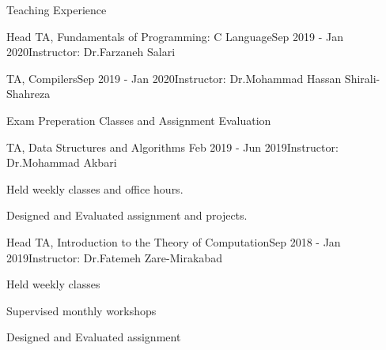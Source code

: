 \documentclass{resume} %
\begin{document}
\begin{rSection}{Teaching Experience}
\begin{rSubsection}{Head TA, Fundamentals of Programming: C Language}{Sep 2019 - Jan 2020}{Instructor: Dr.Farzaneh Salari}{ }
		\end{rSubsection}					%
		\begin{rSubsection}{TA, Compilers}{Sep 2019 - Jan 2020}{Instructor: Dr.Mohammad Hassan Shirali-Shahreza}{ }
		\item Exam Preperation Classes and Assignment Evaluation
		\end{rSubsection}					%
		\begin{rSubsection}{TA, Data Structures and Algorithms }{Feb 2019 - Jun 2019}{Instructor: Dr.Mohammad Akbari}{ }
			\item 
			Held weekly classes and office hours.
			\item 
			Designed and Evaluated assignment and projects.\\
		\end{rSubsection}
		\begin{rSubsection}{Head TA, Introduction to the Theory of Computation}{Sep 2018 - Jan 2019}{Instructor: Dr.Fatemeh Zare-Mirakabad}{ }
			\item Held weekly classes 
			\item Supervised monthly workshops
			\item Designed and Evaluated assignment 		
		\end{rSubsection}
		
	\end{rSection}
\end{document}
